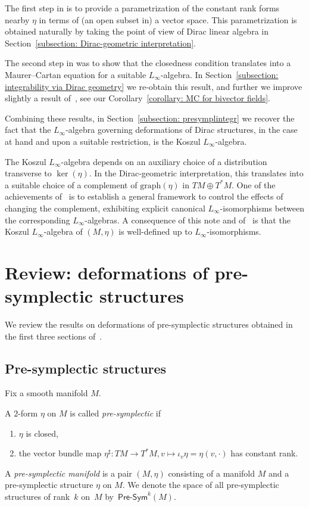 \documentclass[10pt,a4paper]{amsart}
\numberwithin{equation}{section}
\newcommand{\Presym}{\mathsf{Pre}\textrm{-}\mathsf{Sym}}
\renewcommand{\graph}{\mathrm{graph}}
\renewcommand{\graph}{\mathrm{graph}}
\begin{document}
 The first step in \cite{SZPre} is to provide a parametrization of the constant rank forms nearby $\eta$ in terms of (an open subset in) a vector space. This parametrization is obtained naturally by taking the point of view of Dirac linear algebra in Section~\ref{subsection: Dirac-geometric interpretation}.

 The second step in \cite{SZPre} was to show that the closedness condition translates into a Maurer--Cartan equation for a suitable $L_{\infty}$-algebra. In Section~\ref{subsection: integrability via Dirac geometry} we re-obtain this result, and further we improve slightly a result of~\cite{SZPre}, see our Corollary~\ref{corollary: MC for bivector fields}.

Combining these results, in Section~\ref{subsection: presymplintegr} we recover the fact that the $L_{\infty}$-algebra governing deformations of Dirac structures, in the case at hand and upon a suitable restriction, is the Koszul $L_{\infty}$-algebra.

The Koszul $L_{\infty}$-algebra depends on an auxiliary choice of a distribution transverse to $\ker(\eta)$. In the Dirac-geometric interpretation, this translates into a suitable choice of a complement of $\graph(\eta)$ in $TM\oplus T^*M$. One of the achievements of~\cite{GMS} is to establish a general framework to control the effects of changing the complement, exhibiting explicit canonical $L_{\infty}$-isomorphisms between the corresponding $L_{\infty}$-algebras. A consequence of this note and of~\cite{GMS} is that the Koszul $L_{\infty}$-algebra of $(M,\eta)$ is well-defined up to $L_{\infty}$-isomorphisms.

\section{Review: deformations of pre-symplectic structures}\label{section: pre-symplectic structures}

{We review the results on deformations of pre-symplectic structures obtained in the first three sections of~\cite{SZPre}.}

\subsection{Pre-symplectic structures}\label{subsection: pre-symplectic structures}

Fix a smooth manifold $M$.

\begin{Definition}\label{definition: pre-symplectic}A $2$-form $\eta$ on $M$ is called \emph{pre-symplectic} if
\begin{enumerate}\itemsep=0pt
\item[1)] $\eta$ is closed,
\item[2)] the vector bundle map $\eta^\sharp\colon TM \to T^*M, v\mapsto \iota_v\eta = \eta(v,\cdot)$ has constant rank.
\end{enumerate}

A \emph{pre-symplectic manifold} is a pair $(M,\eta)$ consisting of a manifold $M$ and a pre-symplectic structure $\eta$ on $M$. We denote the space of all pre-symplectic structures of rank~$k$ on~$M$ by~$\Presym^k(M)$.
\end{Definition}
\end{document}
